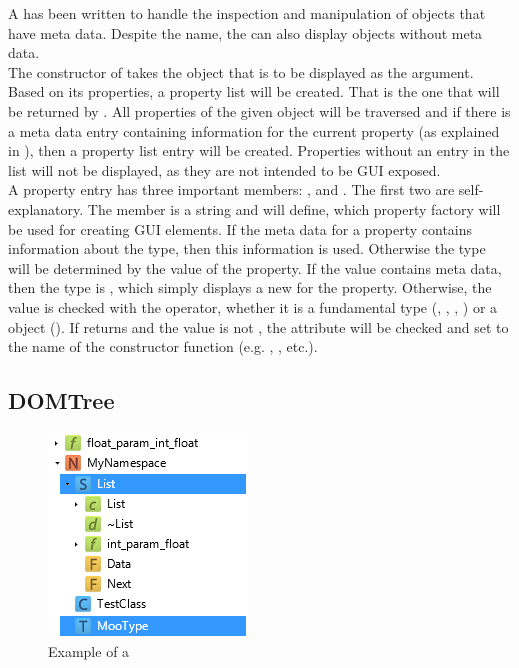 A  has been written to handle the inspection and manipulation of  objects that have meta data. Despite the name, the  can also display objects without meta data.\\
The constructor of  takes the object that is to be displayed as the argument. Based on its properties, a property list will be created. That is the one that will be returned by . All properties of the given object will be traversed and if there is a meta data entry containing  information for the current property (as explained in ), then a property list entry will be created. Properties without an entry in the list will not be displayed, as they are not intended to be GUI exposed.\\
A property entry has three important members: ,  and . The first two are self-explanatory. The  member is a string and will define, which property factory will be used for creating GUI elements. If the meta data for a property contains information about the type, then this information is used. Otherwise the type will be determined by the value of the property. If the value contains meta data, then the type is , which simply displays a new  for the property. Otherwise, the value is checked with the   operator, whether it is a fundamental type (, , , ) or a  object (). If  returns  and the value is not , the  attribute will be checked and  set to the name of the constructor function (e.g. , , etc.).

\subsection{DOMTree}

\begin{figure}
  \begin{center}
    \includegraphics[scale=0.75]{Images/DOMTree.png}
  \end{center}
  \caption{Example of a }
  \label{fig:DOMTree}
   \vspace{-15pt}
\end{figure}

